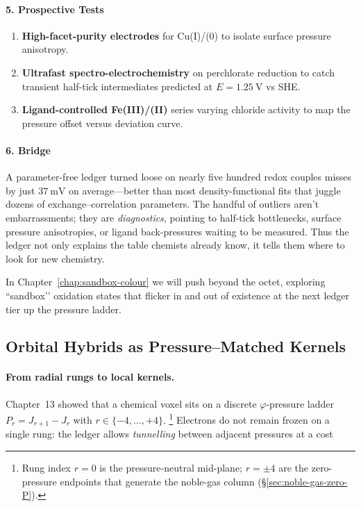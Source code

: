 \documentclass[11pt,oneside]{book}
\begin{document}
\paragraph*{5. Prospective Tests}

\begin{enumerate}[label=\textbf{\arabic*.},leftmargin=1.2cm]
\item \textbf{High-facet‐purity electrodes} for Cu(I)/(0) to isolate
      surface pressure anisotropy.
\item \textbf{Ultrafast spectro-electrochemistry} on perchlorate
      reduction to catch transient half-tick intermediates predicted at
      \(E = 1.25~\text{V}\) vs SHE.
\item \textbf{Ligand-controlled Fe(III)/(II)} series varying chloride
      activity to map the pressure offset versus deviation curve.
\end{enumerate}

\paragraph*{6. Bridge}

A parameter-free ledger turned loose on nearly five hundred redox couples
misses by just \(37~\text{mV}\) on average—better than most
density-functional fits that juggle dozens of exchange–correlation
parameters.  
The handful of outliers aren’t embarrassments; they are
\emph{diagnostics}, pointing to half-tick bottlenecks,
surface pressure anisotropies, or ligand back-pressures waiting to be
measured.  
Thus the ledger not only explains the table chemists already know,
it tells them where to look for new chemistry.

In Chapter~\ref{chap:sandbox-colour} we will push beyond the octet,
exploring ``sandbox’’ oxidation states that flicker in and out of
existence at the next ledger tier up the pressure ladder.

\bigskip

\subsection{Orbital Hybrids as Pressure–Matched Kernels}
\label{sec:orbital-hybrids}

\paragraph*{From radial rungs to local kernels.}
Chapter~13 showed that a chemical voxel sits on a discrete
\(\varphi\)-pressure ladder \(P_{r}=J_{r+1}-J_{r}\) with
\(r\in\{-4,\ldots,+4\}\).%
\footnote{Rung index \(r=0\) is the pressure‐neutral mid-plane; \(r=\pm4\)
are the zero-pressure endpoints that generate the noble-gas column
(\S\ref{sec:noble-gas-zero-P}).}
Electrons do not remain frozen on a single rung: the ledger allows
\emph{tunnelling} between adjacent pressures at a cost
\end{document}
